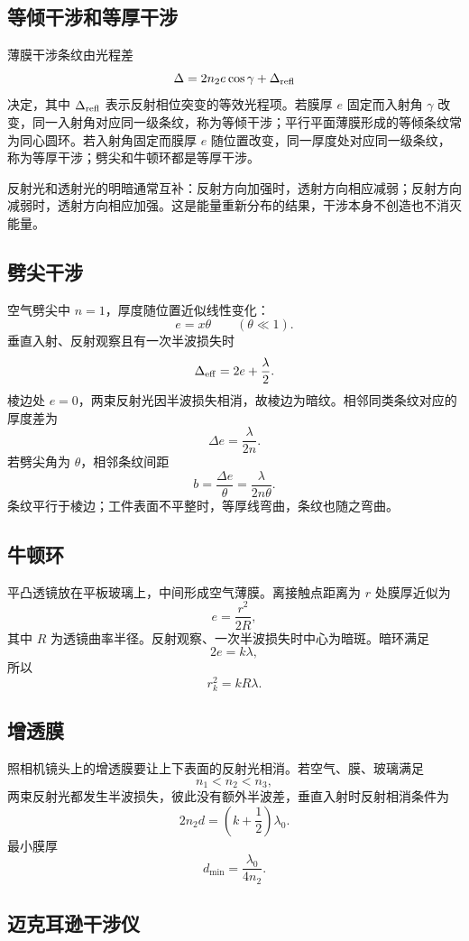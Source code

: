 \subsection*{等倾干涉和等厚干涉}

薄膜干涉条纹由光程差
\[
  \Delta=2n_2e\cos\gamma+\Delta_{\rm refl}
\]
决定，其中 $\Delta_{\rm refl}$ 表示反射相位突变的等效光程项。若膜厚 $e$ 固定而入射角 $\gamma$ 改变，同一入射角对应同一级条纹，称为等倾干涉；平行平面薄膜形成的等倾条纹常为同心圆环。若入射角固定而膜厚 $e$ 随位置改变，同一厚度处对应同一级条纹，称为等厚干涉；劈尖和牛顿环都是等厚干涉。

反射光和透射光的明暗通常互补：反射方向加强时，透射方向相应减弱；反射方向减弱时，透射方向相应加强。这是能量重新分布的结果，干涉本身不创造也不消灭能量。

\subsection*{劈尖干涉}

空气劈尖中 $n=1$，厚度随位置近似线性变化：
\[
  e=x\theta\qquad(\theta\ll1).
\]
垂直入射、反射观察且有一次半波损失时
\[
  \Delta_{\rm eff}=2e+\frac{\lambda}{2}.
\]
棱边处 $e=0$，两束反射光因半波损失相消，故棱边为暗纹。相邻同类条纹对应的厚度差为
\[
  \Delta e=\frac{\lambda}{2n}.
\]
若劈尖角为 $\theta$，相邻条纹间距
\[
  b=\frac{\Delta e}{\theta}=\frac{\lambda}{2n\theta}.
\]
条纹平行于棱边；工件表面不平整时，等厚线弯曲，条纹也随之弯曲。

\subsection*{牛顿环}

平凸透镜放在平板玻璃上，中间形成空气薄膜。离接触点距离为 $r$ 处膜厚近似为
\[
  e=\frac{r^2}{2R},
\]
其中 $R$ 为透镜曲率半径。反射观察、一次半波损失时中心为暗斑。暗环满足
\[
  2e=k\lambda,
\]
所以
\[
  r_k^2=kR\lambda.
\]

\subsection*{增透膜}

照相机镜头上的增透膜要让上下表面的反射光相消。若空气、膜、玻璃满足
\[
  n_1<n_2<n_3,
\]
两束反射光都发生半波损失，彼此没有额外半波差，垂直入射时反射相消条件为
\[
  2n_2d=\left(k+\frac12\right)\lambda_0.
\]
最小膜厚
\[
  d_{\min}=\frac{\lambda_0}{4n_2}.
\]

\subsection*{迈克耳逊干涉仪}

